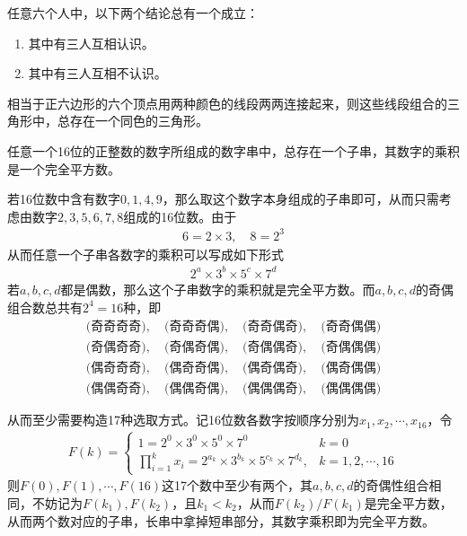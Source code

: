 \begin{question}
  任意六个人中，以下两个结论总有一个成立：
  \begin{enumerate}
  \item 其中有三人互相认识。
  \item 其中有三人互相不认识。
  \end{enumerate}
\end{question}

\hints 相当于正六边形的六个顶点用两种颜色的线段两两连接起来，则这些线段组合的三角形中，总存在一个同色的三角形。

\begin{question}
  任意一个16位的正整数的数字所组成的数字串中，总存在一个子串，其数字的乘积是一个完全平方数。
\end{question}

\hints 若16位数中含有数字$0,1,4,9$，那么取这个数字本身组成的子串即可，从而只需考虑由数字$2,3,5,6,7,8$组成的16位数。由于
\begin{align*}
  6 = 2\times 3,\quad 8=2^3
\end{align*}
从而任意一个子串各数字的乘积可以写成如下形式
\begin{align*}
  2^a \times 3^b \times 5^c \times 7^d
\end{align*}
若$a,b,c,d$都是偶数，那么这个子串数字的乘积就是完全平方数。而$a,b,c,d$的奇偶组合数总共有$2^4=16$种，即
\begin{align*}
  \text{(奇奇奇奇)},\quad \text{(奇奇奇偶)},\quad \text{(奇奇偶奇)},\quad \text{(奇奇偶偶)}\\
  \text{(奇偶奇奇)},\quad \text{(奇偶奇偶)},\quad \text{(奇偶偶奇)},\quad \text{(奇偶偶偶)}\\
  \text{(偶奇奇奇)},\quad \text{(偶奇奇偶)},\quad \text{(偶奇偶奇)},\quad \text{(偶奇偶偶)}\\
  \text{(偶偶奇奇)},\quad \text{(偶偶奇偶)},\quad \text{(偶偶偶奇)},\quad \text{(偶偶偶偶)}
\end{align*}

从而至少需要构造17种选取方式。记16位数各数字按顺序分别为$x_1,x_2,\cdots,x_{16}$，令
\begin{align*}
  F(k) =
  \begin{cases}
    1 = 2^0 \times 3^0 \times 5^0 \times 7^0 & k=0\\
    \prod_{i=1}^k x_i = 2^{a_k} \times 3^{b_k} \times 5^{c_k} \times 7^{d_k},&k=1,2,\cdots,16
  \end{cases}
\end{align*}
则$F(0),F(1),\cdots,F(16)$这17个数中至少有两个，其$a,b,c,d$的奇偶性组合相同，不妨记为$F(k_1),F(k_2)$，且$k_1<k_2$，从而$F(k_2)/F(k_1)$是完全平方数，从而两个数对应的子串，长串中拿掉短串部分，其数字乘积即为完全平方数。
